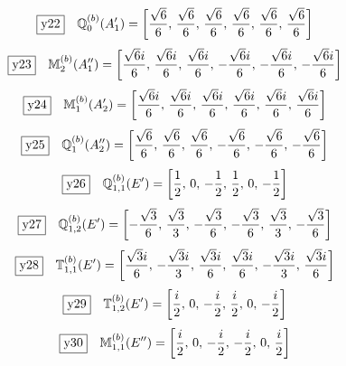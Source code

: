 \documentclass[fleqn,10pt,landscape]{jsarticle}
\begin{document}
\begin{dmath*}
\fbox{y22}\quad \mathbb{Q}_{0}^{(b)}(A_{1}^{\prime})=\left[ \frac{\sqrt{6}}{6},\, \frac{\sqrt{6}}{6},\, \frac{\sqrt{6}}{6},\, \frac{\sqrt{6}}{6},\, \frac{\sqrt{6}}{6},\, \frac{\sqrt{6}}{6} \right]
\end{dmath*}
\begin{dmath*}
\fbox{y23}\quad \mathbb{M}_{2}^{(b)}(A_{1}^{\prime\prime})=\left[ \frac{\sqrt{6} i}{6},\, \frac{\sqrt{6} i}{6},\, \frac{\sqrt{6} i}{6},\, - \frac{\sqrt{6} i}{6},\, - \frac{\sqrt{6} i}{6},\, - \frac{\sqrt{6} i}{6} \right]
\end{dmath*}
\begin{dmath*}
\fbox{y24}\quad \mathbb{M}_{1}^{(b)}(A_{2}^{\prime})=\left[ \frac{\sqrt{6} i}{6},\, \frac{\sqrt{6} i}{6},\, \frac{\sqrt{6} i}{6},\, \frac{\sqrt{6} i}{6},\, \frac{\sqrt{6} i}{6},\, \frac{\sqrt{6} i}{6} \right]
\end{dmath*}
\begin{dmath*}
\fbox{y25}\quad \mathbb{Q}_{1}^{(b)}(A_{2}^{\prime\prime})=\left[ \frac{\sqrt{6}}{6},\, \frac{\sqrt{6}}{6},\, \frac{\sqrt{6}}{6},\, - \frac{\sqrt{6}}{6},\, - \frac{\sqrt{6}}{6},\, - \frac{\sqrt{6}}{6} \right]
\end{dmath*}
\begin{dmath*}
\fbox{y26}\quad \mathbb{Q}_{1,1}^{(b)}(E^{\prime})=\left[ \frac{1}{2},\, 0,\, - \frac{1}{2},\, \frac{1}{2},\, 0,\, - \frac{1}{2} \right]
\end{dmath*}
\begin{dmath*}
\fbox{y27}\quad \mathbb{Q}_{1,2}^{(b)}(E^{\prime})=\left[ - \frac{\sqrt{3}}{6},\, \frac{\sqrt{3}}{3},\, - \frac{\sqrt{3}}{6},\, - \frac{\sqrt{3}}{6},\, \frac{\sqrt{3}}{3},\, - \frac{\sqrt{3}}{6} \right]
\end{dmath*}
\begin{dmath*}
\fbox{y28}\quad \mathbb{T}_{1,1}^{(b)}(E^{\prime})=\left[ \frac{\sqrt{3} i}{6},\, - \frac{\sqrt{3} i}{3},\, \frac{\sqrt{3} i}{6},\, \frac{\sqrt{3} i}{6},\, - \frac{\sqrt{3} i}{3},\, \frac{\sqrt{3} i}{6} \right]
\end{dmath*}
\begin{dmath*}
\fbox{y29}\quad \mathbb{T}_{1,2}^{(b)}(E^{\prime})=\left[ \frac{i}{2},\, 0,\, - \frac{i}{2},\, \frac{i}{2},\, 0,\, - \frac{i}{2} \right]
\end{dmath*}
\begin{dmath*}
\fbox{y30}\quad \mathbb{M}_{1,1}^{(b)}(E^{\prime\prime})=\left[ \frac{i}{2},\, 0,\, - \frac{i}{2},\, - \frac{i}{2},\, 0,\, \frac{i}{2} \right]
\end{dmath*}
\end{document}
